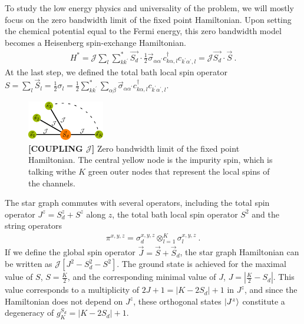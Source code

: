 \documentclass[reprint,prb,superscriptaddress]{revtex4-1}
\begin{document}
To study the low energy physics and universality of the problem, we will mostly focus on the zero bandwidth limit of the fixed point Hamiltonian. Upon setting the chemical potential equal to the Fermi energy, this zero bandwidth model becomes a Heisenberg spin-exchange Hamiltonian.
\begin{equation}\begin{aligned}
	\label{stargraph}
	H^* = {\mathcal{J}}\sum_l\sum_{kk^\prime}^* \vec{S_d}\cdot\frac{1}{2}\vec{\sigma}_{\alpha\alpha^\prime}c_{k\alpha,l}^\dagger c_{k^\prime\alpha^\prime, l} = {\mathcal{J}}\vec{S_d}\cdot\vec S~.
\end{aligned}\end{equation}
At the last step, we defined the total bath local spin operator \(S = \sum_l \vec{S}_l = \frac{1}{2}\sigma_l = \frac{1}{2}\sum_{kk^\prime}^*\sum_{\alpha\beta}\vec{\sigma}_{\alpha\alpha^\prime}c_{k\alpha,l}^\dagger c_{k^\prime\alpha^\prime, l}\).
\begin{figure}[htpb]
	\centering
	\includegraphics[width=0.30\textwidth]{plt/stargraph.pdf}
	\caption{\textbf{[COUPLING $\mathcal{J}$]} Zero bandwidth limit of the fixed point Hamiltonian. The central yellow node is the impurity spin, which is talking withe \(K\) green outer nodes that represent the local spins of the channels.}
	\label{fig:stargraph}
\end{figure}
The star graph commutes with several operators, including the total spin operator \(J^z = S_d^z + S^z\) along \(z\), the total bath local spin operator \(S^2\) and the string operators 
\begin{equation}\begin{aligned}
\pi^{x,y,z} = \sigma_d^{x,y,z} \otimes_{l=1}^K \sigma_l^{x,y,z}~.
\end{aligned}\end{equation}
If we define the global spin operator \(\vec J = \vec S + \vec S_d\), the star graph Hamiltonian can be written as \(\mathcal{J}\left[J^2 - S_d^2 - S^2\right] \). The ground state is achieved for the maximal value of \(S\), \(S=\frac{K}{2}\), and the corresponding minimal value of \(J\), \(J = |\frac{K}{2} - S_d|\). This value corresponds to a multiplicity of \(2J+1 = |K - 2S_d|+1\) in \(J^z\), and since the Hamiltonian does not depend on \(J^z\), these orthogonal states \(\ket{J^z}\) constitute a degeneracy of \(g^{S_d}_K = |K - 2S_d|+1\).
\end{document}
